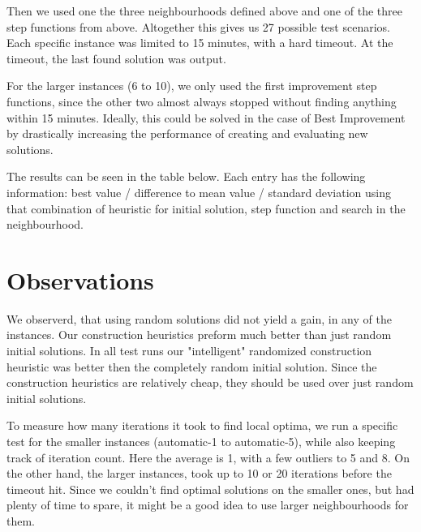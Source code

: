 \documentclass [11pt]{article}
\begin{document}
Then we used one the three neighbourhoods defined above and one of the three step functions from above. Altogether this gives us 27 possible test scenarios.  Each specific instance was limited to 15 minutes, with a hard timeout. At the timeout, the last found solution was output. 

For the larger instances (6 to 10), we only used the first improvement step functions, since the other two almost always stopped without finding anything within 15 minutes. Ideally, this could be solved in the case of Best Improvement by drastically increasing the performance of creating and evaluating new solutions. 

The results can be seen in the table below. Each entry has the following information: best value / difference to mean value / standard deviation using that combination of heuristic for initial solution, step function and search in the neighbourhood. 

\section{Observations}
We observerd, that using random solutions did not yield a gain, in any of the instances. Our construction heuristics preform much better than just random initial solutions. In all test runs our "intelligent" randomized construction heuristic was better then the completely random initial solution.  Since the construction heuristics are relatively cheap, they should be used over just random initial solutions.

To measure how many iterations it took to find local optima, we run a specific test for the smaller instances (automatic-1 to automatic-5), while also keeping track of iteration count. Here the average is 1, with a few outliers to 5 and 8. On the other hand, the larger instances, took up to 10 or 20 iterations before the timeout hit. Since we couldn't find optimal solutions on the smaller ones, but had plenty of time to spare, it might be a good idea to use larger neighbourhoods for them. 
\end{document}
